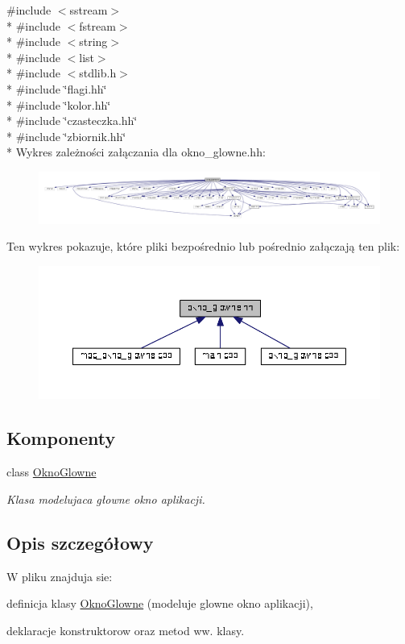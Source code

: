 {\ttfamily \#include $<$sstream$>$}\\*
{\ttfamily \#include $<$fstream$>$}\\*
{\ttfamily \#include $<$string$>$}\\*
{\ttfamily \#include $<$list$>$}\\*
{\ttfamily \#include $<$stdlib.\+h$>$}\\*
{\ttfamily \#include \char`\"{}flagi.\+hh\char`\"{}}\\*
{\ttfamily \#include \char`\"{}kolor.\+hh\char`\"{}}\\*
{\ttfamily \#include \char`\"{}czasteczka.\+hh\char`\"{}}\\*
{\ttfamily \#include \char`\"{}zbiornik.\+hh\char`\"{}}\\*
Wykres zależności załączania dla okno\+\_\+glowne.\+hh\+:\nopagebreak
\begin{figure}[H]
\begin{center}
\leavevmode
\includegraphics[width=350pt]{okno__glowne_8hh__incl}
\end{center}
\end{figure}
Ten wykres pokazuje, które pliki bezpośrednio lub pośrednio załączają ten plik\+:\nopagebreak
\begin{figure}[H]
\begin{center}
\leavevmode
\includegraphics[width=350pt]{okno__glowne_8hh__dep__incl}
\end{center}
\end{figure}
\subsection*{Komponenty}
\begin{DoxyCompactItemize}
\item 
class \hyperlink{class_okno_glowne}{Okno\+Glowne}
\begin{DoxyCompactList}\small\item\em Klasa modelujaca głowne okno aplikacji. \end{DoxyCompactList}\end{DoxyCompactItemize}


\subsection{Opis szczegółowy}
W pliku znajduja sie\+:
\begin{DoxyItemize}
\item definicja klasy \hyperlink{class_okno_glowne}{Okno\+Glowne} (modeluje glowne okno aplikacji),
\item deklaracje konstruktorow oraz metod ww. klasy. 
\end{DoxyItemize}